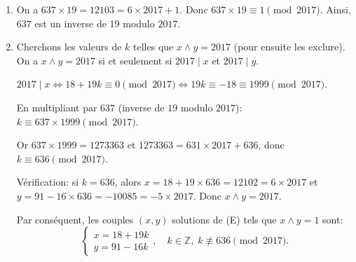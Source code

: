 \begin{enumerate}
    \item On a $637 \times 19 = 12103 = 6 \times 2017 + 1$.
    Donc $637 \times 19 \equiv 1 \pmod{2017}$.
    Ainsi, $637$ est un inverse de $19$ modulo $2017$.

    \item Cherchons les valeurs de $k$ telles que $x \wedge y = 2017$ (pour ensuite les exclure).
    On a $x \wedge y = 2017$ si et seulement si $2017 \mid x$ et $2017 \mid y$.

    $2017 \mid x \iff 18+19k \equiv 0 \pmod{2017} \iff 19k \equiv -18 \equiv 1999 \pmod{2017}$.

    En multipliant par $637$ (inverse de $19$ modulo $2017$):
    $k \equiv 637 \times 1999 \pmod{2017}$.

    Or $637 \times 1999 = 1273363$ et $1273363 = 631 \times 2017 + 636$, donc $k \equiv 636 \pmod{2017}$.

    Vérification: si $k = 636$, alors $x = 18 + 19 \times 636 = 12102 = 6 \times 2017$ et $y = 91 - 16 \times 636 = -10085 = -5 \times 2017$.
    Donc $x \wedge y = 2017$.

    Par conséquent, les couples $(x,y)$ solutions de (E) tels que $x \wedge y = 1$ sont:
    \[
    \begin{cases} x = 18+19k \\ y = 91-16k \end{cases}, \quad k \in \mathbb{Z},\; k \not\equiv 636 \pmod{2017}.
    \]
\end{enumerate}
